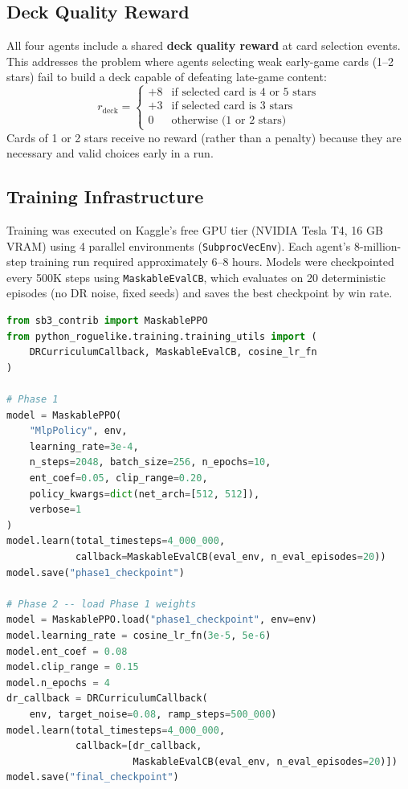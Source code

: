 \subsection{Deck Quality Reward}

All four agents include a shared \textbf{deck quality reward} at card selection events. This addresses the problem where agents selecting weak early-game cards (1--2 stars) fail to build a deck capable of defeating late-game content:
\begin{equation}
r_{\text{deck}} = \begin{cases}
+8 & \text{if selected card is 4 or 5 stars} \\
+3 & \text{if selected card is 3 stars} \\
0  & \text{otherwise (1 or 2 stars)}
\end{cases}
\end{equation}
Cards of 1 or 2 stars receive no reward (rather than a penalty) because they are necessary and valid choices early in a run.

\subsection{Training Infrastructure}

Training was executed on Kaggle's free GPU tier (NVIDIA Tesla T4, 16 GB VRAM) using 4 parallel environments (\texttt{SubprocVecEnv}). Each agent's 8-million-step training run required approximately 6--8 hours. Models were checkpointed every 500K steps using \texttt{MaskableEvalCB}, which evaluates on 20 deterministic episodes (no DR noise, fixed seeds) and saves the best checkpoint by win rate.

\begin{lstlisting}[language=Python, caption={Training launch code (simplified)}]
from sb3_contrib import MaskablePPO
from python_roguelike.training.training_utils import (
    DRCurriculumCallback, MaskableEvalCB, cosine_lr_fn
)

# Phase 1
model = MaskablePPO(
    "MlpPolicy", env,
    learning_rate=3e-4,
    n_steps=2048, batch_size=256, n_epochs=10,
    ent_coef=0.05, clip_range=0.20,
    policy_kwargs=dict(net_arch=[512, 512]),
    verbose=1
)
model.learn(total_timesteps=4_000_000,
            callback=MaskableEvalCB(eval_env, n_eval_episodes=20))
model.save("phase1_checkpoint")

# Phase 2 -- load Phase 1 weights
model = MaskablePPO.load("phase1_checkpoint", env=env)
model.learning_rate = cosine_lr_fn(3e-5, 5e-6)
model.ent_coef = 0.08
model.clip_range = 0.15
model.n_epochs = 4
dr_callback = DRCurriculumCallback(
    env, target_noise=0.08, ramp_steps=500_000)
model.learn(total_timesteps=4_000_000,
            callback=[dr_callback,
                      MaskableEvalCB(eval_env, n_eval_episodes=20)])
model.save("final_checkpoint")
\end{lstlisting}

